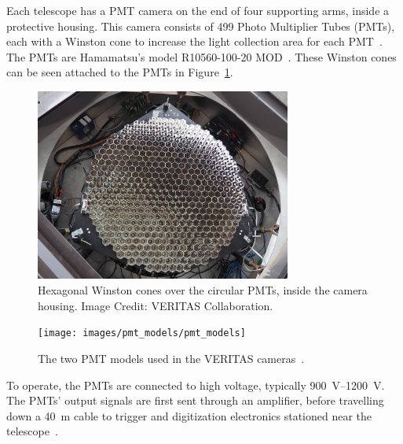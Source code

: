 Each telescope has a PMT camera on the end of four supporting arms, inside a protective housing.
This camera consists of 499 Photo Multiplier Tubes (PMTs), each with a Winston cone to increase the light collection area for each PMT~\cite{Winston1970}.
The PMTs are Hamamatsu's model R10560-100-20 MOD~\cite{pmtmodels}.
These Winston cones can be seen attached to the PMTs in Figure~\ref{fig:winstcones}.

\begin{figure}[ht]
  \centering
  \includegraphics[width=0.75\textwidth]{images/winston_cones_t2}
  \caption[Winston Cones]{
    Hexagonal Winston cones over the circular PMTs, inside the camera housing.
    Image Credit: VERITAS Collaboration.
    \CaptionBlankLine
    }
  \label{fig:winstcones}
\end{figure}


\begin{figure}[ht]
  \centering
  \texttt{[image: images/pmt\_models/pmt\_models]}
  \caption[PMT Models]{
    The two PMT models used in the VERITAS cameras~\cite{pmtmodels}.}
  \label{fig:pmtmodels}
\end{figure}

To operate, the PMTs are connected to high voltage, typically \SIrange{900}{1200}{V}.
%
%
The PMTs' output signals are first sent through an amplifier, before travelling down a \nicetilde{}\SI{40}{m} cable to trigger and digitization electronics stationed near the telescope~\cite{firstVeritas}.

